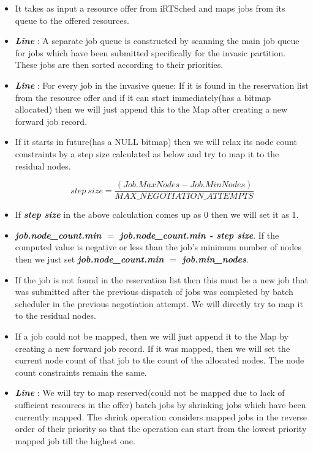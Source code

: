 \begin{itemize}
\item It takes as input a resource offer from iRTSched and maps jobs from its queue to the offered resources.
\item \textbf{\textit{Line }}: A separate job queue is constructed by scanning the main job queue for jobs which have been submitted specifically for the invasic partition. These jobs are then sorted according to their priorities.
\item \textbf{\textit{Line }}: For every job in the invasive queue: If it is found in the reservation list from the resource offer and if it can start immediately(has a bitmap allocated) then we will just append this to the Map after creating a new forward job record.
\item If it starts in future(has a NULL bitmap) then we will relax its node count constraints by a step size calculated as below and try to map it to the residual nodes.
\vspace{-0.30in}
\begin{center}
\boldmath\begin{equation*}
step\ size = \frac{(Job.MaxNodes - Job.MinNodes)}{MAX\_NEGOTIATION\_ATTEMPTS}
\end{equation*}
\end{center}
\item If \textbf{\textit{step size}} in the above calculation comes up as $0$ then we will set it as $1$.
\item \textbf{\textit{job.node\_count.min $=$ job.node\_count.min - step size}}. If the computed value is negative or less than the job's minimum number of nodes then we just set \textbf{\textit{job.node\_count.min $=$ job.min\_nodes}}.
\item If the job is not found in the reservation list then this must be a new job that was submitted after the previous dispatch of jobs was completed by batch scheduler in the previous negotiation attempt. We will directly try to map it to the residual nodes.
\item If a job could not be mapped, then we will just append it to the Map by creating a new forward job record. If it was mapped, then we will set the current node count of that job to the count of the allocated nodes. The node count constraints remain the same.
\item \textbf{\textit{Line }}: We will try to map reserved(could not be mapped due to lack of sufficient resources in the offer) batch jobs by shrinking jobs which have been currently mapped. The shrink operation considers mapped jobs in the reverse order of their priority so that the operation can start from the lowest priority mapped job till the highest one.

\end{itemize}
